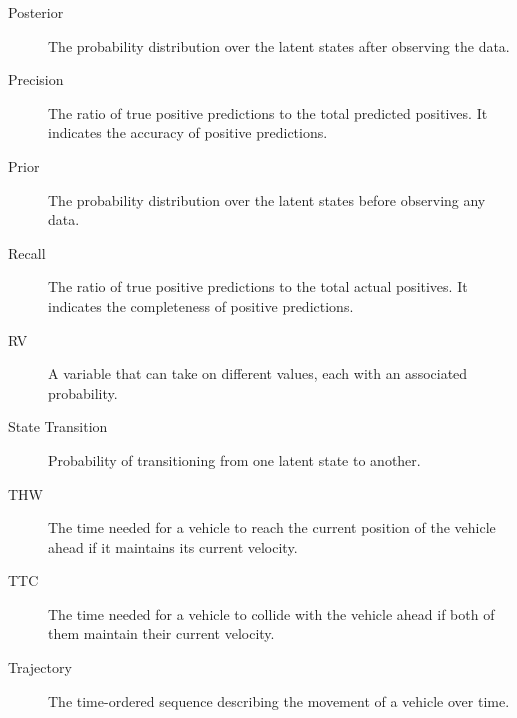 \begin{description}
    \item [Posterior] The probability distribution over the latent states after observing the data.
    \item [Precision] The ratio of true positive predictions to the total predicted positives. It indicates the accuracy of positive predictions.
    \item [Prior] The probability distribution over the latent states before observing any data.
    \item [Recall] The ratio of true positive predictions to the total actual positives. It indicates the completeness of positive predictions.
    \item [\ac{RV}] A variable that can take on different values, each with an associated probability.
    \item [State Transition] Probability of transitioning from one latent state to another.
    \item [\ac{THW}] The time needed for a vehicle to reach the current position of the vehicle ahead if it maintains its current velocity.
    \item [\ac{TTC}] The time needed for a vehicle to collide with the vehicle ahead if both of them maintain their current velocity.
    \item [Trajectory] The time-ordered sequence describing the movement of a vehicle over time.
\end{description}
